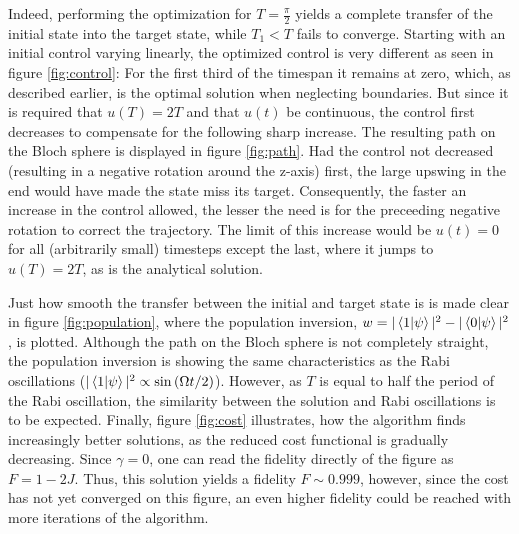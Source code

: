 Indeed, performing the optimization for $T = \frac{\pi}{2}$ yields a complete transfer of the initial state into the target state, while $T_1 < T$ fails to converge. Starting with an initial control varying linearly, the optimized control is very different as seen in figure \ref{fig:control}: For the first third of the timespan it remains at zero, which, as described earlier, is the optimal solution when neglecting boundaries. But since it is required that $u(T) = 2 T$ and that $u(t)$ be continuous, the control first decreases to compensate for the following sharp increase.
The resulting path on the Bloch sphere is displayed in figure \ref{fig:path}. Had the control not decreased (resulting in a negative rotation around the z-axis) first, the large upswing in the end would have made the state miss its target. Consequently, the faster an increase in the control allowed, the lesser the need is for the preceeding negative rotation to correct the trajectory. The limit of this increase would be $u(t)=0$ for all (arbitrarily small) timesteps except the last, where it jumps to $u(T)=2T$, as is the analytical solution.

Just how smooth the transfer between the initial and target state is is made clear in figure \ref{fig:population}, where the population inversion, $w = |\braket{1|\psi}|^2 - |\braket{0|\psi}|^2$, is plotted. Although the path on the Bloch sphere is not completely straight, the population inversion is showing the same characteristics as the Rabi oscillations ($|\braket{1|\psi}|^2 \propto \sin \left( \Omega t / 2 \right)$). However, as $T$ is equal to half the period of the Rabi oscillation, the similarity between the solution and Rabi oscillations is to be expected.
Finally, figure \ref{fig:cost} illustrates, how the algorithm finds increasingly better solutions, as the reduced cost functional is gradually decreasing. Since $\gamma = 0$, one can read the fidelity directly of the figure as $F = 1 - 2 J$. Thus, this solution yields a fidelity $F \sim 0.999$, however, since the cost has not yet converged on this figure, an even higher fidelity could be reached with more iterations of the algorithm. 


